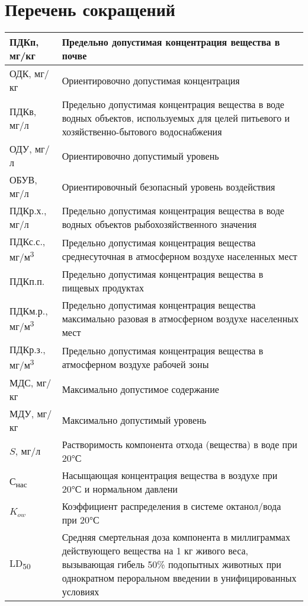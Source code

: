 \section{Перечень сокращений}%
\label{sec:shorthands}

\begin{tabu}to \textwidth{|X[c]|X[2]|}%
\hline%
ПДКп, мг/кг&Предельно допустимая концентрация вещества в почве\\%
\hline%
ОДК, мг/кг&Ориентировочно допустимая концентрация\\%
\hline%
ПДКв, мг/л&Предельно допустимая концентрация вещества в воде водных объектов, используемых для целей питьевого и хозяйственно{-}бытового водоснабжения\\%
\hline%
ОДУ, мг/л&Ориентировочно допустимый уровень\\%
\hline%
ОБУВ, мг/л&Ориентировочный безопасный уровень воздействия\\%
\hline%
ПДКр.х., мг/л&Предельно допустимая концентрация вещества в воде водных объектов рыбохозяйственного значения\\%
\hline%
ПДКс.с., мг/м\textsuperscript{3}&Предельно допустимая концентрация вещества среднесуточная в атмосферном воздухе населенных мест\\%
\hline%
ПДКп.п.&Предельно допустимая концентрация вещества в пищевых продуктах\\%
\hline%
ПДКм.р., мг/м\textsuperscript{3}&Предельно допустимая концентрация вещества максимально разовая в атмосферном воздухе населенных мест\\%
\hline%
ПДКр.з., мг/м\textsuperscript{3}&Предельно допустимая концентрация вещества в атмосферном воздухе рабочей зоны\\%
\hline%
МДС, мг/кг&Максимально допустимое содержание\\%
\hline%
МДУ, мг/кг&Максимально допустимый уровень\\%
\hline%
$S$, мг/л&Растворимость компонента отхода (вещества) в воде при 20°С\\%
\hline%
С\textsubscript{нас}&Насыщающая концентрация вещества в воздухе при 20°С и нормальном давлени\\%
\hline%
$K_{ow}$&Коэффициент распределения в системе октанол/вода при 20°С\\%
\hline%
LD\textsubscript{50}&Средняя смертельная доза компонента в миллиграммах действующего вещества на 1 кг живого веса, вызывающая гибель 50\% подопытных животных при однократном пероральном введении в унифицированных условиях\\%
\hline%
\end{tabu}
